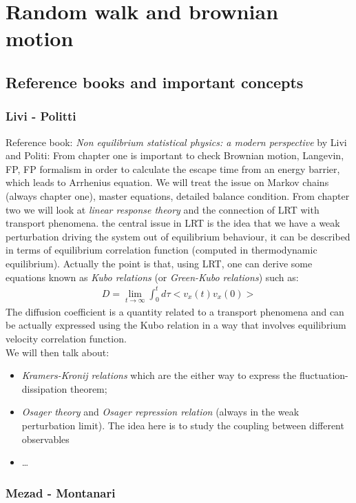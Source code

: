 \documentclass[\main/main.tex]{subfiles}
\begin{document}
\section{Random walk and brownian motion}

\subsection{Reference books and important concepts}
\subsubsection{Livi - Politti}
Reference book: \textit{Non equilibrium statistical physics: a modern perspective} by Livi and Politi:
From chapter one is important to check Brownian motion, Langevin, FP, FP formalism in order to calculate the escape time from an energy barrier, which leads to Arrhenius equation. 
We will treat the issue on Markov chains (always chapter one), master equations, detailed balance condition.
From chapter two we will look at \textit{linear response theory} and the connection of LRT with transport phenomena. the central issue in LRT is the idea that we have a weak perturbation driving the system out of equilibrium behaviour, it can be described in terms of equilibrium correlation function (computed in thermodynamic equilibrium). Actually the point is that, using LRT, one can derive some equations known as\textit{ Kubo relations} (or\textit{ Green-Kubo relations}) such as:
\begin{eqnarray}
D=\lim_{t\to\infty} \int_0 ^{t}d\tau <v_x(t)v_x(0)>
\end{eqnarray}
The diffusion coefficient is a quantity related to a transport phenomena and can be actually expressed using the Kubo relation in a way that involves equilibrium velocity correlation function. \\
We will then talk about:
\begin{itemize}
    \item \textit{Kramers-Kronij relations} which are the either way to express the fluctuation-dissipation theorem;
    \item \textit{Osager theory} and \textit{Osager repression relation} (always in the weak perturbation limit). The idea here is to study the coupling between different observables
    \item \dots
\end{itemize}

\subsubsection{Mezad - Montanari}
\end{document}
